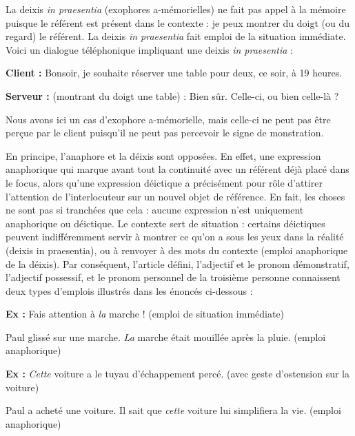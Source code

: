 La deixis \textit{in praesentia} (exophores a-mémorielles) ne fait pas appel à la mémoire puisque le référent est présent dans le contexte : je peux montrer du doigt (ou du regard) le référent. La deixis \textit{in praesentia} fait emploi de la situation immédiate. Voici un dialogue téléphonique impliquant une deixis \textit{in praesentia} :

\textbf{Client :} Bonsoir, je souhaite réserver une table pour deux, ce soir, à 19 heures.

\textbf{Serveur :} (montrant du doigt une table) : Bien sûr. Celle-ci, ou bien celle-là ?

Nous avons ici un cas d’exophore a-mémorielle, mais celle-ci ne peut pas être perçue par le client puisqu’il ne peut pas percevoir le signe de monstration.

En principe, l’anaphore et la déixis sont opposées. En effet, une expression anaphorique qui marque avant tout la continuité avec un référent déjà placé dans le focus, alors qu’une expression déictique a précisément pour rôle d’attirer l’attention de l’interlocuteur sur un nouvel objet de référence. En fait, les choses ne sont pas si tranchées que cela : aucune expression n’est uniquement anaphorique ou déictique. Le contexte sert de situation : certains déictiques peuvent indifféremment servir à montrer ce qu’on a sous les yeux dans la réalité (deixis in praesentia), ou à renvoyer à des mots du contexte (emploi anaphorique de la déixis). Par conséquent, l’article défini, l’adjectif et le pronom démonstratif, l’adjectif possessif, et le pronom personnel de la troisième personne connaissent deux types d’emplois illustrés dans les énoncés ci-dessous :

\textbf{Ex :} Fais attention à \textit{la} marche ! (emploi de situation immédiate)

\hspace*{1.5em}Paul glissé sur une marche. \textit{La} marche était mouillée après la pluie. (emploi anaphorique)

\textbf{Ex :} \textit{Cette} voiture a le tuyau d’échappement percé. (avec geste d’ostension sur la voiture)

\hspace*{1.5em}Paul a acheté une voiture. Il sait que \textit{cette} voiture lui simplifiera la vie. (emploi anaphorique)

